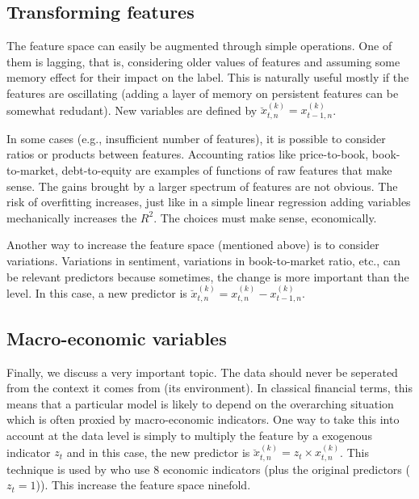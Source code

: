 \documentclass[]{krantz}
\theoremstyle{definition}
\theoremstyle{definition}
\theoremstyle{definition}
\theoremstyle{remark}
\begin{document}
\hypertarget{transforming-features}{%
\subsection{Transforming features}\label{transforming-features}}

The feature space can easily be augmented through simple operations. One
of them is lagging, that is, considering older values of features and
assuming some memory effect for their impact on the label. This is
naturally useful mostly if the features are oscillating (adding a layer
of memory on persistent features can be somewhat redudant). New
variables are defined by \(\breve{x}_{t,n}^{(k)}=x_{t-1,n}^{(k)}\).

In some cases (e.g., insufficient number of features), it is possible to
consider ratios or products between features. Accounting ratios like
price-to-book, book-to-market, debt-to-equity are examples of functions
of raw features that make sense. The gains brought by a larger spectrum
of features are not obvious. The risk of overfitting increases, just
like in a simple linear regression adding variables mechanically
increases the \(R^2\). The choices must make sense, economically.

Another way to increase the feature space (mentioned above) is to
consider variations. Variations in sentiment, variations in
book-to-market ratio, etc., can be relevant predictors because
sometimes, the change is more important than the level. In this case, a
new predictor is
\(\breve{x}_{t,n}^{(k)}=x_{t,n}^{(k)}-x_{t-1,n}^{(k)}\).

\hypertarget{macro-economic-variables}{%
\subsection{Macro-economic variables}\label{macro-economic-variables}}

Finally, we discuss a very important topic. The data should never be
seperated from the context it comes from (its environment). In classical
financial terms, this means that a particular model is likely to depend
on the overarching situation which is often proxied by macro-economic
indicators. One way to take this into account at the data level is
simply to multiply the feature by a exogenous indicator \(z_{t}\) and in
this case, the new predictor is
\(\breve{x}_{t,n}^{(k)}=z_t \times x_{t,n}^{(k)}\). This technique is
used by \citet{gu2018empirical} who use 8 economic indicators (plus the
original predictors (\(z_t=1\))). This increase the feature space
ninefold.
\end{document}
